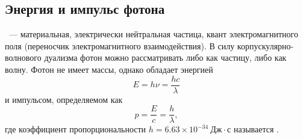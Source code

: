 \subsection{Энергия и импульс фотона}
~--- материальная, электрически нейтральная частица, квант электромагнитного поля (переносчик электромагнитного взаимодействия). В силу корпускулярно-волнового дуализма фотон можно рассматривать либо как частицу, либо как волну. Фотон не имеет массы, однако обладает энергией
\begin{equation}
	E = h \nu = \frac{h c}{\lambda}
\end{equation}
и импульсом, определяемом как
\begin{equation}
	p = \frac{E}{c} = \frac{h}{\lambda},
\end{equation}
где коэффициент пропорциональности $h = 6.63 \times 10^{-34}~\text{Дж}\cdot\text{с}$ называется .
